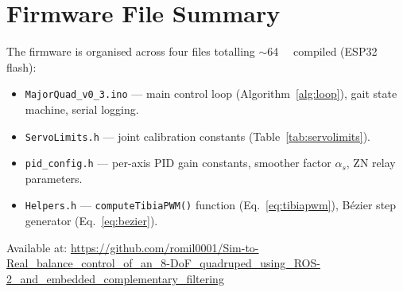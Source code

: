 \documentclass[journal]{IEEEtran}
\begin{document}
\section{Firmware File Summary}
\label{app:firmware}
The firmware is organised across four files totalling
$\sim$\SI{64}{\kilo\byte} compiled (ESP32 flash):
\begin{itemize}
\item \texttt{MajorQuad\_v0\_3.ino} --- main control loop
      (Algorithm~\ref{alg:loop}), gait state machine,
      serial logging.
\item \texttt{ServoLimits.h} --- joint calibration constants
      (Table~\ref{tab:servolimits}).
\item \texttt{pid\_config.h} --- per-axis PID gain constants,
      smoother factor $\alpha_s$, ZN relay parameters.
\item \texttt{Helpers.h} --- \texttt{computeTibiaPWM()} function
      (Eq.~\ref{eq:tibiapwm}), Bézier step generator
      (Eq.~\ref{eq:bezier}).
\end{itemize}
Available at: \url{https://github.com/romil0001/Sim-to-Real_balance_control_of_an_8-DoF_quadruped_using_ROS-2_and_embedded_complementary_filtering}
\end{document}
